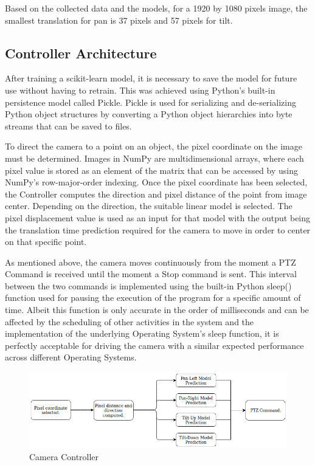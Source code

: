 \documentclass{l4proj}
\begin{document}
Based on the collected data and the models, for a 1920 by 1080 pixels image, the smallest translation for pan is 37 pixels and 57 pixels for tilt.




\subsection{Controller Architecture}

After training a scikit-learn model, it is necessary to save the model for future use without having to retrain. This was achieved using Python's built-in persistence model called Pickle. Pickle is used for serializing and de-serializing Python object structures by converting a Python object hierarchies into byte streams that can be saved to files.


To direct the camera to a point on an object, the pixel coordinate on the image must be determined. Images in NumPy are multidimensional arrays, where each pixel value is stored as an element of the matrix that can be accessed by using NumPy's row-major-order indexing. Once the pixel coordinate has been selected, the Controller computes the direction and pixel distance of the point from image center. Depending on the direction, the suitable linear model is selected. The pixel displacement value is used as an input for that model with the output being the translation time prediction required for the camera to move in order to center on that specific point.

As mentioned above, the camera moves continuously from the moment a PTZ Command is received until the moment a Stop command is sent. This interval between the two commands is implemented using the built-in Python sleep() function used for pausing the execution of the program for a specific amount of time. Albeit this function is only accurate in the order of milliseconds and can be affected by the scheduling of other activities in the system and the implementation of the underlying Operating System's sleep function, it is perfectly acceptable for driving the camera with a similar expected performance across different Operating Systems.  



\begin{figure}[ht]
    \centering
    \includegraphics[width=1\textwidth]{l4template-master/images/Controller.png}
    \caption{Camera Controller}
    \label{controllerarchitecture}
\end{figure}
\end{document}

